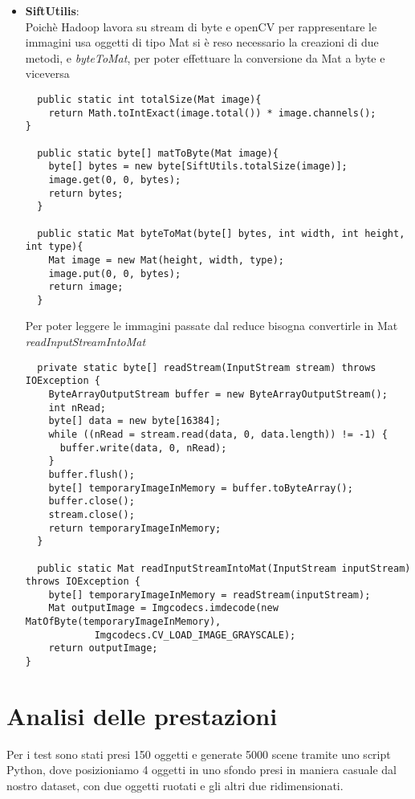 \begin{itemize}
\item  \textbf{SiftUtilis}: \\
Poichè Hadoop lavora su stream di byte e openCV per rappresentare le immagini usa oggetti di tipo Mat si è reso necessario la creazioni di due metodi,  e \emph{\textit{byteToMat}}, per poter effettuare la conversione da Mat a byte e viceversa
\begin{lstlisting}
  public static int totalSize(Mat image){
    return Math.toIntExact(image.total()) * image.channels();
}

  public static byte[] matToByte(Mat image){
    byte[] bytes = new byte[SiftUtils.totalSize(image)];
    image.get(0, 0, bytes);
    return bytes;
  }
  
  public static Mat byteToMat(byte[] bytes, int width, int height, int type){
    Mat image = new Mat(height, width, type);
    image.put(0, 0, bytes);
    return image;
  }
\end{lstlisting}
Per poter leggere le immagini passate dal reduce bisogna convertirle in Mat \emph{\textit{readInputStreamIntoMat}}
\begin{lstlisting}
  private static byte[] readStream(InputStream stream) throws IOException {
    ByteArrayOutputStream buffer = new ByteArrayOutputStream();
    int nRead;
    byte[] data = new byte[16384];
    while ((nRead = stream.read(data, 0, data.length)) != -1) {
      buffer.write(data, 0, nRead);
    }
    buffer.flush();
    byte[] temporaryImageInMemory = buffer.toByteArray();
    buffer.close();
    stream.close();
    return temporaryImageInMemory;
  }

  public static Mat readInputStreamIntoMat(InputStream inputStream) throws IOException {
    byte[] temporaryImageInMemory = readStream(inputStream);
    Mat outputImage = Imgcodecs.imdecode(new MatOfByte(temporaryImageInMemory),
            Imgcodecs.CV_LOAD_IMAGE_GRAYSCALE);
    return outputImage;
}
\end{lstlisting}
\end{itemize}
\section{Analisi delle prestazioni}
Per i test sono stati presi 150 oggetti e generate 5000 scene tramite uno script Python, dove posizioniamo 4 oggetti in uno sfondo presi in maniera casuale dal nostro dataset,  con due oggetti ruotati e gli altri due ridimensionati.
